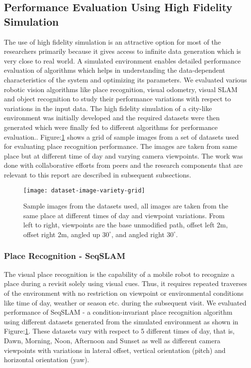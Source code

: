 \documentclass{article}
\begin{document}
\subsection{Performance Evaluation Using High Fidelity Simulation}
The use of high fidelity simulation is an attractive option for most of the researchers primarily because it gives access to infinite data generation which is very close to real world. A simulated environment enables detailed performance evaluation of algorithms which helps in understanding the data-dependent characteristics of the system and optimizing its parameters. We evaluated various robotic vision algorithms like place recognition, visual odometry, visual SLAM and object recognition to study their performance variations with respect to variations in the input data. The high fidelity simulation of a city-like environment was initially developed and the required datasets were then generated which were finally fed to different algorithms for performance evaluation.. Figure:\ref{fig:simulatedDataImageGrid} shows a grid of sample images from a set of datasets used for evaluating place recognition performance. The images are taken from same place but at different time of day and varying camera viewpoints. The work was done with collaborative efforts from peers and the research components that are relevant to this report are described in subsequent subsections.

\begin{figure}
 \centering
 \texttt{[image: dataset-image-variety-grid]}
 \caption{Sample images from the datasets used, all images are taken from the same place at different times of day and viewpoint variations. From left to right, viewpoints are the base unmodified path, offset left 2m, offset right 2m, angled up $30^{\circ}$, and angled right $30^{\circ}$.}
 \label{fig:simulatedDataImageGrid}
\end{figure}


\subsubsection{Place Recognition - SeqSLAM}
The visual place recognition is the capability of a mobile robot to recognize a place during a revisit solely using visual cues. Thus, it requires repeated traverses of the environment with no restriction on viewpoint or environmental conditions like time of day, weather or season etc. during the subsequent visit. We evaluated performance of SeqSLAM - a condition-invariant place recognition algorithm using different datasets generated from the simulated environment as shown in Figure:\ref{fig:simulatedDataImageGrid}. These datasets vary with respect to 5 different times of day, that is, Dawn, Morning, Noon, Afternoon and Sunset as well as different camera viewpoints with variations in lateral offset, vertical orientation (pitch) and horizontal orientation (yaw). 
\end{document}
